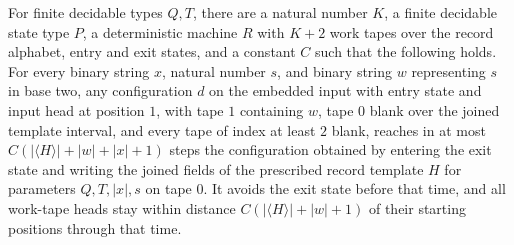 \begin{theorem}
\label{Turing.exists_recordTemplateTM}
\leanok
{}
For finite decidable types $Q,T$, there are a natural number $K$, a finite decidable
state type $P$, a deterministic machine $R$ with $K+2$ work tapes over the record
alphabet, entry and exit states, and a constant $C$ such that the following holds. For
every binary string $x$, natural number $s$, and binary string $w$ representing $s$ in
base two, any configuration $d$ on the embedded input with entry state and input head at
position $1$, with tape $1$ containing $w$, tape $0$ blank over the joined template
interval, and every tape of index at least $2$ blank, reaches in at most $C(|\langle
H\rangle|+|w|+|x|+1)$ steps the configuration obtained by entering the exit state and
writing the joined fields of the prescribed record template $H$ for parameters
$Q,T,|x|,s$ on tape $0$. It avoids the exit state before that time, and all work-tape
heads stay within distance $C(|\langle H\rangle|+|w|+1)$ of their starting positions
through that time.
\end{theorem}

